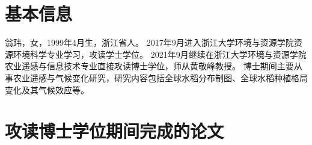 \cleardoublepage
{}

\section*{基本信息}

翁玮，女，1999年4月生，浙江省人。
2017年9月进入浙江大学环境与资源学院资源环境科学专业学习，攻读学士学位。
2021年9月继续在浙江大学环境与资源学院农业遥感与信息技术专业直接攻读博士学位，师从黄敬峰教授。
博士期间主要从事农业遥感与气候变化研究，研究内容包括全球水稻分布制图、全球水稻种植格局变化及其气候效应等。

\section*{攻读博士学位期间完成的论文}

